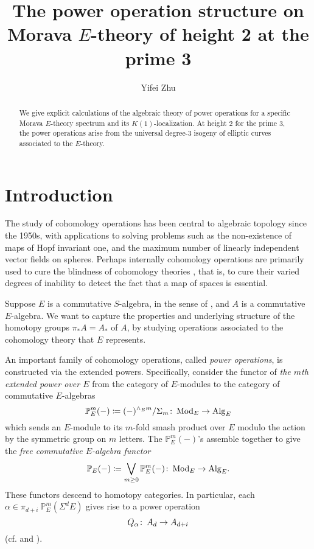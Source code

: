 \documentclass{gtpart}
\title{The power operation structure on Morava $E$-theory of height 2 at the prime 3}
\author{Yifei Zhu}
\theoremstyle{definition}
\theoremstyle{remark}
\def\co{\colon\thinspace}
\newcommand{\mb}[1]{\mathbb{#1}}
\newcommand{\Mod}{{\rm Mod}}
\newcommand{\Alg}{{\rm Alg}}
\newcommand{\cf}{cf.\thinspace}
\newcommand{\BP}{{\mb P}}
\newcommand{\A}{\alpha}
\begin{document}
\begin{abstract}
 We give explicit calculations of the algebraic theory of power operations for a specific Morava $E$-theory spectrum and its $K(1)$-localization.  
 At height 2 for the prime 3, the power operations arise from the universal degree-3 isogeny of elliptic curves associated to the $E$-theory.  
\end{abstract}


\maketitle
\section{Introduction}

The study of cohomology operations has been central to algebraic topology 
since the 1950s, with applications to solving problems such as the non-existence of maps of Hopf invariant one, 
and the maximum number of linearly independent vector fields on spheres.  
Perhaps internally cohomology operations are primarily used to cure the blindness of cohomology theories \cite{blind}, 
that is, to cure their varied degrees of inability to detect the fact that a map of spaces is essential.  

Suppose $E$ is a commutative $S$-algebra, in the sense of \cite{EKMM}, and $A$ is a commutative $E$-algebra.  
We want to capture the properties and underlying structure of the homotopy groups $\pi_* A = A_*$ of $A$, 
by studying operations associated to the cohomology theory that $E$ represents.  

An important family of cohomology operations, called {\em power operations}, is constructed via the extended powers.  
Specifically, consider the functor of {\em the $m$th extended power over $E$} from the category of $E$-modules to the category of commutative $E$-algebras 
\[
 \BP_E^m (-) \coloneqq (-)^{\wedge_E m} / \Sigma_m \co \Mod_E \to \Alg_E 
\]
which sends an $E$-module to its $m$-fold smash product over $E$ modulo the action by the symmetric group on $m$ letters.  
The $\BP_E^m (-)$'s assemble together to give the {\em free commutative $E$-algebra functor} 
\[
 \BP_E (-) \coloneqq \bigvee_{m \geq 0} \BP_E^m (-) \co \Mod_E \to \Alg_E.  
\]
These functors descend to homotopy categories.  
In particular, each $\A \in \pi_{d+i}~\BP_E^m (\Sigma^d E)$ gives rise to a power operation 
\[
 Q_\A \co A_d \to A_{d+i} 
\]
(\cf \cite[Sections I.2 and IX.1]{H_infty} and \cite[Section 3]{cong}).  
\end{document}
